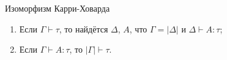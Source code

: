 \documentclass[aspectratio=169]{beamer}
\begin{document}
\begin{frame}{Изоморфизм Карри-Ховарда}
\begin{thm}
\begin{enumerate}
\item Если $\Gamma\vdash\tau$, то найдётся $\Delta$, $A$, что $\Gamma = |\Delta|$ и $\Delta \vdash A : \tau$;
\item Если $\Gamma \vdash A : \tau$, то $|\Gamma| \vdash \tau$.
\end{enumerate}
\end{thm}

\end{frame}
\end{document}
